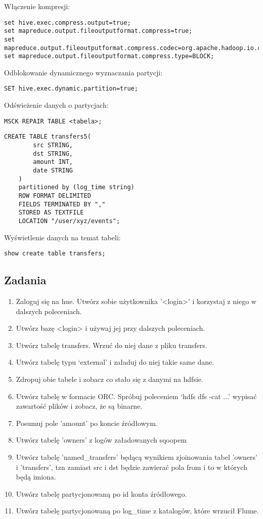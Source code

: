 \documentclass{article}
\begin{document}
Włączenie kompresji:
\begin{lstlisting}
set hive.exec.compress.output=true;
set mapreduce.output.fileoutputformat.compress=true;
set mapreduce.output.fileoutputformat.compress.codec=org.apache.hadoop.io.compress.GzipCodec;
set mapreduce.output.fileoutputformat.compress.type=BLOCK;
\end{lstlisting}

Odblokowanie dynamicznego wyznaczania partycji:
\begin{lstlisting}
SET hive.exec.dynamic.partition=true;
\end{lstlisting}

\pagebreak

Odświeżenie danych o partycjach:
\begin{lstlisting}
MSCK REPAIR TABLE <tabela>;
\end{lstlisting}

\begin{lstlisting}
CREATE TABLE transfers5(
		src STRING,
		dst STRING,
		amount INT,
		date STRING
	)
	partitioned by (log_time string)
	ROW FORMAT DELIMITED
	FIELDS TERMINATED BY ","
	STORED AS TEXTFILE
	LOCATION "/user/xyz/events";
\end{lstlisting}

Wyświetlenie danych na temat tabeli:
\begin{lstlisting}
show create table transfers;
\end{lstlisting}

\subsection*{Zadania}

\begin{enumerate}
\item Zaloguj się na hue. Utwórz sobie użytkownika '<login>' i korzystaj z niego w dalszych poleceniach.
\item Utwórz bazę <login> i używaj jej przy dalszych poleceniach.
\item Utwórz tabelę transfers. Wrzuć do niej dane z pliku transfers.
\item Utwórz tabelę typu ‘external’ i załaduj do niej takie same dane.
\item Zdropuj obie tabele i zobacz co stało się z danymi na hdfsie.
\item Utwórz tabelę w formacie ORC. Spróbuj poleceniem ‘hdfs dfs -cat ...’ wypisać zawartość plików i zobacz, że są binarne.
\item Posumuj pole 'amount' po koncie źródłowym.
\item Utwórz tabelę 'owners' z logów załadowanych sqoopem
\item Utwórz tabelę 'named\_transfers' będącą wynikiem zjoinowania tabel 'owners' i 'transfers', tzn zamiast src i dst będzie zawierać pola from i to w których będą imiona.
\item Utwórz tabelę partycjonowaną po id konta źródłowego.
\item Utwórz tabelę partycjonowaną po log\_time z katalogów, które wrzucił Flume.
\end{enumerate}
\end{document}
